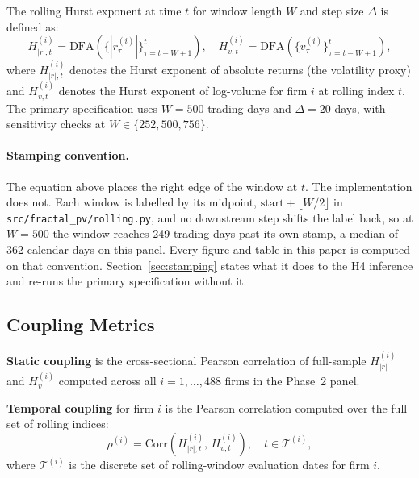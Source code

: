 \documentclass[preprint,12pt,authoryear]{elsarticle}
\begin{document}
The rolling Hurst exponent at time $t$ for window length $W$ and step size $\Delta$ is defined as:
\begin{equation}
H^{(i)}_{|r|,t} = \mathrm{DFA}\!\left(\{|r_\tau^{(i)}|\}_{\tau=t-W+1}^{t}\right), \quad H^{(i)}_{v,t} = \mathrm{DFA}\!\left(\{v_\tau^{(i)}\}_{\tau=t-W+1}^{t}\right),
\end{equation}
where $H^{(i)}_{|r|,t}$ denotes the Hurst exponent of absolute returns (the volatility proxy) and $H^{(i)}_{v,t}$ denotes the Hurst exponent of log-volume for firm $i$ at rolling index $t$. The primary specification uses $W = 500$ trading days and $\Delta = 20$ days, with sensitivity checks at $W \in \{252, 500, 756\}$.

\paragraph{Stamping convention.} The equation above places the right edge of the window at $t$. The implementation does not. Each window is labelled by its midpoint, $\mathrm{start} + \lfloor W/2 \rfloor$ in \texttt{src/fractal\_pv/rolling.py}, and no downstream step shifts the label back, so at $W = 500$ the window reaches 249 trading days past its own stamp, a median of 362 calendar days on this panel. Every figure and table in this paper is computed on that convention. Section~\ref{sec:stamping} states what it does to the H4 inference and re-runs the primary specification without it.

\subsection{Coupling Metrics}
\label{sec:coupling_metrics}

\textbf{Static coupling} is the cross-sectional Pearson correlation of full-sample $H^{(i)}_{|r|}$ and $H^{(i)}_{v}$ computed across all $i = 1, \ldots, 488$ firms in the Phase~2 panel.

\textbf{Temporal coupling} for firm $i$ is the Pearson correlation computed over the full set of rolling indices:
\begin{equation}
\rho^{(i)} = \mathrm{Corr}\!\left(H^{(i)}_{|r|,t},\, H^{(i)}_{v,t}\right), \quad t \in \mathcal{T}^{(i)},
\end{equation}
where $\mathcal{T}^{(i)}$ is the discrete set of rolling-window evaluation dates for firm $i$.
\end{document}
